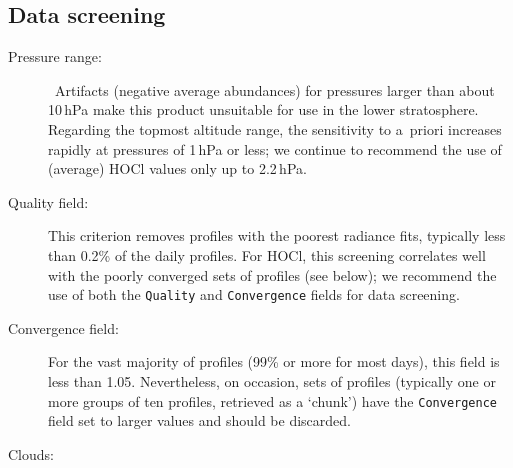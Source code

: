 \begin{nofloatpages}
\subsection{Data screening}
\label{sec:HOClScreening}
\begin{description}
  \item[Pressure range:]  \standardrangestatement\ Artifacts (negative average abundances) for pressures larger than about 10\,hPa make this product unsuitable for use in the lower stratosphere. Regarding the topmost altitude range, the sensitivity to a~priori increases rapidly at pressures of 1\,hPa or less; we continue to recommend the use of (average) HOCl values only up to 2.2\,hPa. \standardprecisionrule \evenstatusrule

  \item[Quality field:] 
  This criterion removes profiles with the poorest radiance fits, typically less than 0.2\% of the daily profiles. For HOCl, this screening correlates well with the poorly converged sets of profiles (see below); we recommend the use of both the \texttt{Quality} and \texttt{Convergence} fields for data screening.

  \item[Convergence field:]  For the vast majority of profiles (99\% or more for most days), this field is less than 1.05. Nevertheless, on occasion, sets of profiles (typically one or more groups of ten profiles, retrieved as a `chunk') have the \texttt{Convergence} field set to larger values and should be discarded.

  \item[Clouds:] \cloudsokrule


\end{description}
\end{nofloatpages}
